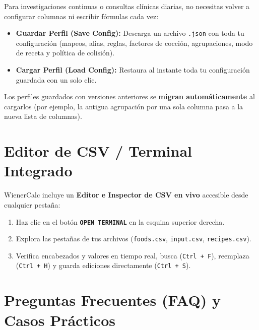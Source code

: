 \documentclass[11pt,a4paper]{article}
\begin{document}
Para investigaciones continuas o consultas clínicas diarias, no necesitas volver a configurar columnas ni escribir fórmulas cada vez:
\begin{itemize}[label=\textcolor{aeroemerald}{$\bullet$}]
    \item \textbf{Guardar Perfil (Save Config):} Descarga un archivo \texttt{.json} con toda tu configuración (mapeos, alias, reglas, factores de cocción, agrupaciones, modo de receta y política de colisión).
    \item \textbf{Cargar Perfil (Load Config):} Restaura al instante toda tu configuración guardada con un solo clic.
\end{itemize}

\begin{tipbox}
Los perfiles guardados con versiones anteriores se \textbf{migran automáticamente} al cargarlos (por ejemplo, la antigua agrupación por una sola columna pasa a la nueva lista de columnas).
\end{tipbox}

\vspace{0.3cm}

\section{Editor de CSV / Terminal Integrado}

WienerCalc incluye un \textbf{Editor e Inspector de CSV en vivo} accesible desde cualquier pestaña:
\begin{enumerate}[leftmargin=*]
    \item Haz clic en el botón \textbf{\texttt{OPEN TERMINAL}} en la esquina superior derecha.
    \item Explora las pestañas de tus archivos (\texttt{foods.csv}, \texttt{input.csv}, \texttt{recipes.csv}).
    \item Verifica encabezados y valores en tiempo real, busca (\texttt{Ctrl + F}), reemplaza (\texttt{Ctrl + H}) y guarda ediciones directamente (\texttt{Ctrl + S}).
\end{enumerate}

\vspace{0.5cm}

\section{Preguntas Frecuentes (FAQ) y Casos Prácticos}
\end{document}
